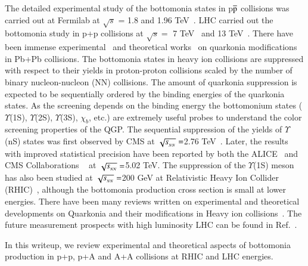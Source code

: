 The detailed experimental study of the bottomonia states in p$\overline{\rm p}$ collisions 
was carried out at Fermilab at $\surd s$ = 1.8 and 1.96 TeV~\cite{CDF:1995gwi,CDF:2001fdy,D0:2005klj}.
LHC carried out the bottomonia study in p+p collisions at
$\surd s=$ 7 TeV~\cite{CMS:2010wld,CMS:2015xqv,ATLAS:2012lmu} and
13 TeV~\cite{CMS:2017dju,LHCb:2018yzj}.
There have been immense
experimental~\cite{Sirunyan:2017isk,Sirunyan:2017lzi,CMS:2018zza,Acharya:2019iur,ALICE:2018wzm}
and theoretical works~\cite{Strickland:2011mw,Song:2011nu,Kumar:2014kfa,Kumar:2019xdj} on
quarkonia modifications in Pb+Pb collisions.
The bottomonia states in heavy ion collisions are suppressed with respect to their yields
in proton-proton collisions scaled by the number of binary nucleon-nucleon
(NN) collisions.
The amount of quarkonia suppression is expected to be sequentially ordered by the binding
energies of the quarkonia states.
 As the screening depends on the  binding energy the bottomonium states ($\Upsilon$(1S), $\Upsilon$(2S),
$\Upsilon$(3S), $\chi_{b}$, etc.) are extremely useful probes to understand the color screening
properties of the QGP.
The sequential suppression of the yields of $\Upsilon$(nS) states was first observed by
CMS at $\sqrt{s_{_{NN}}} =$2.76 TeV~\cite{Chatrchyan:2011pe,Chatrchyan:2012lxa}. Later, the results with
improved statistical precision have been reported by both the ALICE~\cite{ALICE:2018wzm}
and CMS Collaborations ~\cite{Sirunyan:2017lzi,CMS:2018zza} at $\sqrt{s_{_{NN}}} =$5.02 TeV.
The suppression of the $\Upsilon$(1S)
meson has also been studied at $\sqrt{s_{_{NN}}} =$200 GeV at Relativistic Heavy Ion Collider
(RHIC)~\cite{STAR:2013kwk}, although the 
bottomonia production cross section is small at lower energies.
There have been many reviews written on experimental and theoretical developments on Quarkonia and
their modifications in Heavy ion collisions~\cite{Brambilla:2010cs,Andronic:2015wma,Rothkopf:2019ipj}.
The future measurement prospects with high luminosity LHC can be found in Ref.~\cite{Chapon:2020heu}.

In this writeup, we review experimental and theoretical aspects of bottomonia production in p+p, p+A
and A+A collisions at RHIC and LHC energies.








